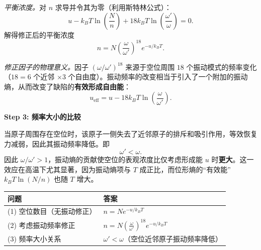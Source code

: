 \begin{derivationbox}[标准解题过程]
\textit{平衡浓度。}对 $n$ 求导并令其为零（利用斯特林公式）：
\begin{equation}
u - k_{\!B}T\ln\!\left(\frac{N}{n}\right) + 18k_{\!B}T\ln\!\left(\frac{\omega'}{\omega}\right) = 0.
\end{equation}
解得修正后的平衡浓度
\begin{equation}
\boxed{n = N\left(\frac{\omega}{\omega'}\right)^{\!18} e^{-u/k_{\!B}T}.}
\label{eq:vacancy-vib-corrected}
\end{equation}

\textit{修正因子的物理意义。}因子 $(\omega/\omega')^{18}$ 来源于空位周围 $18$ 个振动模式的频率变化（$18=6$ 个近邻 $\times 3$ 个自由度）。振动频率的改变相当于引入了一个附加的振动熵，从而改变了缺陷的\textbf{有效形成自由能}：
\begin{equation}
u_{\mathrm{eff}} = u - 18k_{\!B}T\ln\!\left(\frac{\omega}{\omega'}\right).
\end{equation}

\textbf{Step 3: 频率大小的比较}

当原子周围存在空位时，该原子一侧失去了近邻原子的排斥和吸引作用，等效恢复力减弱，因此其振动频率降低。即
\begin{equation}
\boxed{\omega' < \omega.}
\end{equation}
因此 $\omega/\omega' > 1$，振动熵的贡献使空位的表观浓度比仅考虑形成能 $u$ 时\textbf{更大}。这一效应在高温下尤其显著，因为振动熵项与 $T$ 成正比，而位形熵的``有效能'' $k_{\!B}T\ln(N/n)$ 也随 $T$ 增大。
\end{derivationbox}

\begin{formulabox}[答案汇总]
\begin{center}
\begin{tabular}{ll}
\toprule
\textbf{问题} & \textbf{答案} \\
\midrule
(1) 空位数目（无振动修正） & $n = N e^{-u/k_{\!B}T}$ \\
(2) 考虑振动频率修正 & $\displaystyle n = N\left(\frac{\omega}{\omega'}\right)^{\!18} e^{-u/k_{\!B}T}$ \\
(3) 频率大小关系 & $\omega' < \omega$（空位近邻原子振动频率降低） \\
\bottomrule
\end{tabular}
\end{center}
\end{formulabox}

